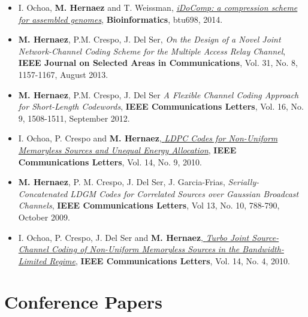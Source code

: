 \documentclass[11pt,a4paper,sans]{moderncv}        %
\begin{document}
\begin{itemize}
\item I. Ochoa, \textbf{M. Hernaez} and T. Weissman, \href{http://web.stanford.edu/~iochoa/publishedPublications/2014_idocomp_paper.pdf}{\emph{ iDoComp: a compression scheme for assembled genomes}}, \textbf{Bioinformatics}, btu698, 2014.\\

\item \textbf{M. Hernaez}, P.M. Crespo, J. {Del Ser}, {\emph{ On the Design of a Novel Joint Network-Channel Coding Scheme for the Multiple Access Relay Channel}}, \textbf{IEEE Journal on Selected Areas in Communications}, Vol. 31, No. 8, 1157-1167, August 2013.\\

\item \textbf{M. Hernaez}, P.M. Crespo, J. {Del Ser} \emph{A Flexible Channel Coding Approach for Short-Length Codewords}, \textbf{IEEE Communications Letters}, Vol. 16, No. 9, 1508-1511, September 2012.\\

\item I. Ochoa, P. Crespo and \textbf{M. Hernaez},\href{http://web.stanford.edu/~iochoa/publishedPublications/2010_ldpc_paper.pdf} {\emph{ LDPC Codes for Non-Uniform Memoryless Sources and Unequal Energy Allocation}}, \textbf{IEEE Communications Letters}, Vol. 14, No. 9, 2010.\\

\item \textbf{M. Hernaez}, P. M. Crespo, J. {Del Ser}, J. Garcia-Frias, {\emph{ Serially-Concatenated LDGM Codes for Correlated Sources over Gaussian Broadcast Channels}}, \textbf{IEEE Communications Letters}, Vol 13, No. 10, 788-790, October 2009.\\

\item I. Ochoa, P. Crespo, J. Del Ser and \textbf{M. Hernaez},\href{http://web.stanford.edu/~iochoa/publishedPublications/2010_turbo_paper.pdf} {\emph{ Turbo Joint Source-Channel Coding of Non-Uniform Memoryless Sources in the Bandwidth-Limited Regime}}, \textbf{IEEE Communications Letters}, Vol. 14, No. 4, 2010.\\

\end{itemize}

\section{Conference Papers}
\end{document}
